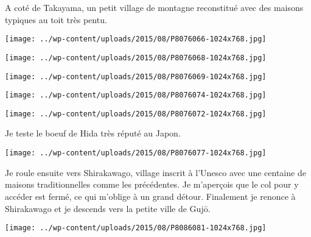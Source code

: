  

 A coté de Takayama, un petit village de montagne reconstitué avec des maisons typiques au toit très pentu. 

 

\begin{center} \texttt{[image: ../wp-content/uploads/2015/08/P8076066-1024x768.jpg]} \end{center}

 

 

\begin{center} \texttt{[image: ../wp-content/uploads/2015/08/P8076068-1024x768.jpg]} \end{center}

 

 

\begin{center} \texttt{[image: ../wp-content/uploads/2015/08/P8076069-1024x768.jpg]} \end{center}

 

 

\begin{center} \texttt{[image: ../wp-content/uploads/2015/08/P8076074-1024x768.jpg]} \end{center}

 

 

\begin{center} \texttt{[image: ../wp-content/uploads/2015/08/P8076072-1024x768.jpg]} \end{center}

 

 Je teste le boeuf de Hida très réputé au Japon. 

 

\begin{center} \texttt{[image: ../wp-content/uploads/2015/08/P8076077-1024x768.jpg]} \end{center}

 

 Je roule ensuite vers Shirakawago, village inscrit à l'Unesco avec une centaine de maisons traditionnelles comme les précédentes. Je m'aperçois que le col pour y accéder est fermé, ce qui m'oblige à un grand détour. Finalement je renonce à Shirakawago et je descends vers la petite ville de Gujō. 

 

\begin{center} \texttt{[image: ../wp-content/uploads/2015/08/P8086081-1024x768.jpg]} \end{center}

